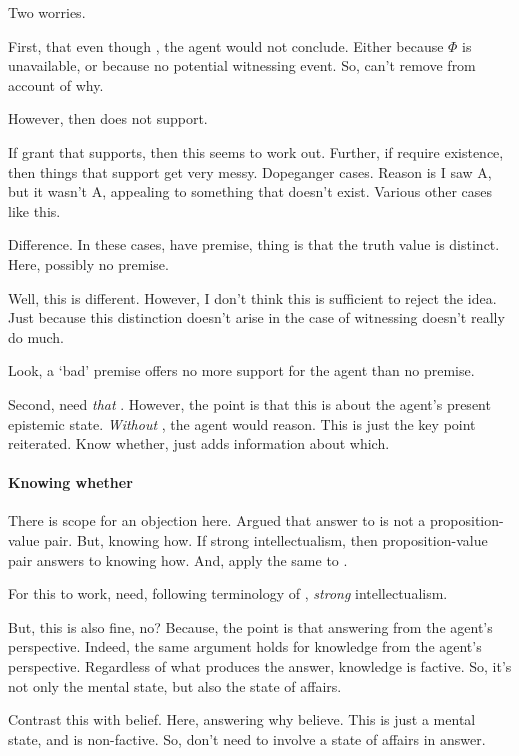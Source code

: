 \begin{note}
  Two worries.

  First, that even though , the agent would not conclude.
  Either because \(\Phi\) is unavailable, or because no potential witnessing event.
  So, can't remove  from account of why.

  However, then  does not support.

  If grant that  supports, then this seems to work out.
  Further, if require existence, then things that support get very messy.
  Dopeganger cases.
  Reason is I saw A, but it wasn't A, appealing to something that doesn't exist.
  Various other cases like this.

  Difference.
  In these cases, have premise, thing is that the truth value is distinct.
  Here, possibly no premise.

  Well, this is different.
  However, I don't think this is sufficient to reject the idea.
  Just because this distinction doesn't arise in the case of witnessing doesn't really do much.

  Look, a `bad' premise offers no more support for the agent than no premise.

  Second, need \emph{that} .
  However, the point is that this is about the agent's present epistemic state.
  \emph{Without} , the agent would reason.
  This is just the key point reiterated.
  Know whether,  just adds information about which.
\end{note}

\paragraph{Knowing whether}

\begin{note}
  \color{red}
  There is scope for an objection here.
  Argued that answer to \qzS{} is not a proposition-value pair.
  But, knowing how.
  If strong intellectualism, then proposition-value pair answers to knowing how.
  And, apply the same to \qzS{}.

  For this to work, need, following terminology of \textcite{Glick:2011vd}, \emph{strong} intellectualism.

  But, this is also fine, no?
  Because, the point is that answering from the agent's perspective.
  Indeed, the same argument holds for knowledge from the agent's perspective.
  Regardless of what produces the answer, knowledge is factive.
  So, it's not only the mental state, but also the state of affairs.

  Contrast this with belief.
  Here, answering why believe.
  This is just a mental state, and is non-factive.
  So, don't need to involve a state of affairs in answer.
\end{note}

